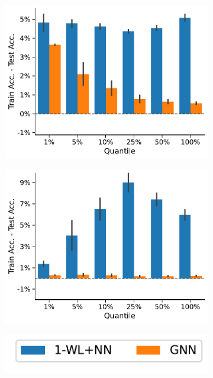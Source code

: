 \begin{figure}[!b]
	\hfill
	\begin{subfigure}[b]{0.3\textwidth}
		\centering
		\includegraphics[width=\textwidth]{Figures/train_test_diff_PROTEINS.pdf}
		\vspace*{-4ex} 
		\caption{\proteins}
	\end{subfigure}
	\hfill
	\begin{subfigure}[b]{0.3\textwidth}
		\centering
		\includegraphics[width=\textwidth]{Figures/train_test_diff_REDDIT-BINARY.pdf}
		\vspace*{-4ex} 
		\caption{\reddit}
	\end{subfigure}
	\centering
	\begin{subfigure}[b]{0.3\textwidth}
		\centering
		\includegraphics[width=\textwidth]{Figures/train_test_diff_legend.pdf}

\end{subfigure}
\end{figure}
